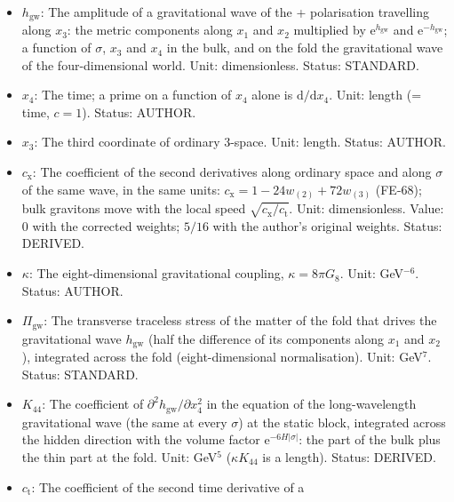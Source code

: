 \documentclass[
  10pt,
]{article}
\begin{document}
\begin{itemize}
  variable at fixed values of the others (\(\partial_\sigma\) with
  respect to \(\sigma\); \(\partial_M\) and \(\partial_\mu\) with
  respect to the coordinate that carries the same index, of the eight
  dimensions or of the fold). Status: STANDARD.
\item
  \(h_{\mathrm{gw}}\): The amplitude of a gravitational wave of the +
  polarisation travelling along \(x_3\): the metric components along
  \(x_1\) and \(x_2\) multiplied by \(\mathrm{e}^{h_{\mathrm{gw}}}\) and
  \(\mathrm{e}^{-h_{\mathrm{gw}}}\); a function of \(\sigma\), \(x_3\)
  and \(x_4\) in the bulk, and on the fold the gravitational wave of the
  four-dimensional world. Unit: dimensionless. Status: STANDARD.
\item
  \(x_4\): The time; a prime on a function of \(x_4\) alone is
  \(\mathrm{d}/\mathrm{d}x_4\). Unit: length (= time, \(c = 1\)).
  Status: AUTHOR.
\item
  \(x_3\): The third coordinate of ordinary 3-space. Unit: length.
  Status: AUTHOR.
\item
  \(c_{\mathrm{x}}\): The coefficient of the second derivatives along
  ordinary space and along \(\sigma\) of the same wave, in the same
  units: \(c_{\mathrm{x}} = 1 - 24w_{(2)} + 72w_{(3)}\) (FE-68); bulk
  gravitons move with the local speed
  \(\sqrt{c_{\mathrm{x}}/c_{\mathrm{t}}}\). Unit: dimensionless. Value:
  0 with the corrected weights; \(5/16\) with the author's original
  weights. Status: DERIVED.
\item
  \(\kappa\): The eight-dimensional gravitational coupling,
  \(\kappa = 8\pi G_8\). Unit: GeV\(^{-6}\). Status: AUTHOR.
\item
  \(\Pi_{\mathrm{gw}}\): The transverse traceless stress of the matter
  of the fold that drives the gravitational wave \(h_{\mathrm{gw}}\)
  (half the difference of its components along \(x_1\) and \(x_2\)),
  integrated across the fold (eight-dimensional normalisation). Unit:
  GeV\(^7\). Status: STANDARD.
\item
  \(K_{44}\): The coefficient of
  \(\partial^2h_{\mathrm{gw}}/\partial x_4^2\) in the equation of the
  long-wavelength gravitational wave (the same at every \(\sigma\)) at
  the static block, integrated across the hidden direction with the
  volume factor \(\mathrm{e}^{-6H\lvert\sigma\rvert}\): the part of the
  bulk plus the thin part at the fold. Unit: GeV\(^5\)
  (\(\kappa K_{44}\) is a length). Status: DERIVED.
\item
  \(c_{\mathrm{t}}\): The coefficient of the second time derivative of a

\end{itemize}
\end{document}
